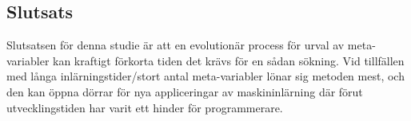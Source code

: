 \documentclass[a4paper, 12pt]{article}
\begin{document}
  \subsection{Slutsats}

  Slutsatsen för denna studie är att en evolutionär process för urval av meta-variabler kan kraftigt förkorta tiden det krävs för en sådan sökning. Vid tillfällen med långa inlärningstider/stort antal meta-variabler lönar sig metoden mest, och den kan öppna dörrar för nya appliceringar av maskininlärning där förut utvecklingstiden har varit ett hinder för programmerare.


\printbibliography
\end{document}
